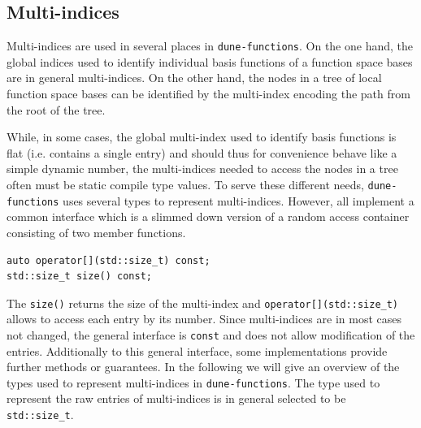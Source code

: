 \documentclass[a4paper,10pt,headings=normal,bibliography=totoc]{scrartcl}
\newcommand{\cpp}[1]{\lstinline[basicstyle=\ttfamily]!#1!}
\newcommand{\dunemodule}[1]{\texttt{#1}}
\begin{document}
\subsection{Multi-indices}
\label{sec:multi_indices}
Multi-indices are used in several places in \dunemodule{dune-functions}.
On the one hand, the global indices used to identify individual
basis functions of a function space bases are in general multi-indices.
On the other hand, the nodes in a tree of local function space bases
can be identified by the multi-index encoding the path from the root
of the tree.

While, in some cases, the global multi-index used to identify
basis functions is flat (i.e. contains a single entry)
and should thus for convenience behave like a simple dynamic number,
the multi-indices needed to access the nodes in a tree often must be
static compile type values.
To serve these different needs, \dunemodule{dune-functions} uses several
types to represent multi-indices. However, all implement
a common interface which is a slimmed down version of a random
access container consisting of two member functions.

\begin{lstlisting}[style=Interface]
auto operator[](std::size_t) const;
std::size_t size() const;
\end{lstlisting}

The \cpp{size()} returns the size of the multi-index
and \cpp{operator[](std::size_t)} allows to access
each entry by its number. Since multi-indices are
in most cases not changed, the general interface
is \cpp{const} and does not allow modification of the
entries.
Additionally to this general interface, some implementations
provide further methods or guarantees. In the following we will
give an overview of the types used to represent multi-indices
in \dunemodule{dune-functions}. The type used to represent
the raw entries of multi-indices is in general selected to
be \cpp{std::size_t}.
\end{document}
